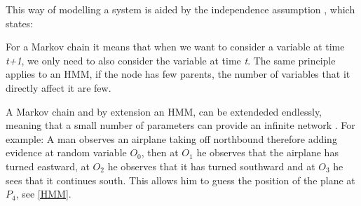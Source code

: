 This way of modelling a system is aided by the independence assumption
\citep[p.240]{MIBook}, which states:
 
 \begin{center}
 \begin{minipage}{0.8\linewidth}
 \end{minipage}
 \end{center}
 
For a Markov chain it means that when we want to consider a variable at time
\textit{t+1}, we only need to also consider the variable at time
\textit{t}. The same principle applies to an HMM, if the node has few parents,
the number of variables that it directly affect it are few.\nl

A Markov chain and by extension an HMM, can be extendeded endlessly, meaning
that a small number of parameters can provide an infinite network
\citep[ch.6.5.1]{MIBook}. For example: A man observes an airplane taking off
northbound therefore adding evidence at random variable $O_0$, then at $O_1$ he
observes that the airplane has turned eastward, at $O_2$ he observes that it
has turned southward and at $O_3$ he sees that it continues south. This allows
him to guess the position of the plane at $P_4$, see \autoref{HMM}. 





% 
